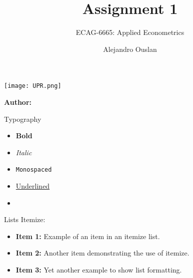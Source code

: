 \documentclass[12pt]{beamer}
\title[]{Assignment 1}
\subtitle{ECAG-6665: Applied Econometrics}
\author[Name Surname]{Alejandro Ouslan}
\institute[UPR.png]{University of Puerto Rico}
\date{} %
\begin{document}
\begin{frame}{}
	\vspace{\fill}

	\texttt{[image: UPR.png]}

	\vspace{\fill}

	\Large
	\color{main}
	\inserttitle

	\medskip

	\large
	\color{black}
	\insertsubtitle

	\vspace{\fill}

	\footnotesize
	\insertinstitute

	\vspace{\fill}

	\textbf{Author:} \insertauthor

	\medskip

	\insertdate

	\vspace{\fill}
\end{frame}

\begin{frame}[allowframebreaks]{Typography}
	\begin{itemize}
		\item \textbf{Bold}
		\item \textit{Italic}
		\item \texttt{Monospaced}
		\item \underline{Underlined}
		\item \href{https://example.com/}{\underline{\color{main}{Link}}}
	\end{itemize}
\end{frame}

\begin{frame}[allowframebreaks]{Lists}
	Itemize:

	\begin{itemize}
		\item \textbf{Item 1:} Example of an item in an itemize list.
		\item \textbf{Item 2:} Another item demonstrating the use of itemize.
		\item \textbf{Item 3:} Yet another example to show list formatting.
	\end{itemize}
\end{frame}
\end{document}
